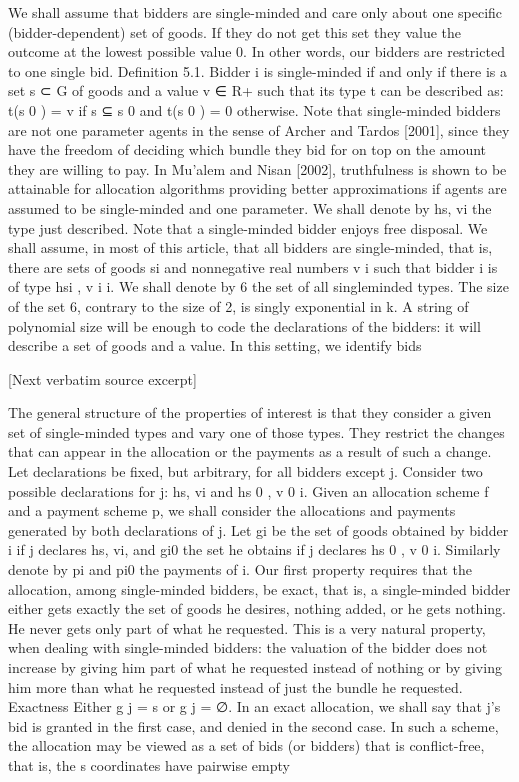 \documentclass[10pt]{article}
\begin{document}
\begin{ReviewVerbatim}

We shall assume that bidders are single-minded and care only about one specific
(bidder-dependent) set of goods. If they do not get this set they value the outcome
at the lowest possible value 0. In other words, our bidders are restricted to one
single bid.
Definition 5.1. Bidder i is single-minded if and only if there is a set s ⊂ G of
goods and a value v ∈ R+ such that its type t can be described as: t(s 0 ) = v if s ⊆ s 0
and t(s 0 ) = 0 otherwise.
Note that single-minded bidders are not one parameter agents in the sense
of Archer and Tardos [2001], since they have the freedom of deciding which bundle
they bid for on top on the amount they are willing to pay. In Mu’alem and Nisan
[2002], truthfulness is shown to be attainable for allocation algorithms providing
better approximations if agents are assumed to be single-minded and one parameter. We shall denote by hs, vi the type just described. Note that a single-minded
bidder enjoys free disposal. We shall assume, in most of this article, that all bidders
are single-minded, that is, there are sets of goods si and nonnegative real numbers
v i such that bidder i is of type hsi , v i i. We shall denote by 6 the set of all singleminded types. The size of the set 6, contrary to the size of 2, is singly exponential
in k. A string of polynomial size will be enough to code the declarations of the
bidders: it will describe a set of goods and a value. In this setting, we identify bids

[Next verbatim source excerpt]

The general structure of the properties of interest is that they consider a given
set of single-minded types and vary one of those types. They restrict the changes
that can appear in the allocation or the payments as a result of such a change.
Let declarations be fixed, but arbitrary, for all bidders except j. Consider two
possible declarations for j: hs, vi and hs 0 , v 0 i. Given an allocation scheme f and a
payment scheme p, we shall consider the allocations and payments generated by
both declarations of j. Let gi be the set of goods obtained by bidder i if j declares
hs, vi, and gi0 the set he obtains if j declares hs 0 , v 0 i. Similarly denote by pi and pi0
the payments of i.
Our first property requires that the allocation, among single-minded bidders, be
exact, that is, a single-minded bidder either gets exactly the set of goods he desires,
nothing added, or he gets nothing. He never gets only part of what he requested. This
is a very natural property, when dealing with single-minded bidders: the valuation
of the bidder does not increase by giving him part of what he requested instead of
nothing or by giving him more than what he requested instead of just the bundle
he requested.
Exactness Either g j = s or g j = ∅.
In an exact allocation, we shall say that j’s bid is granted in the first case, and denied
in the second case. In such a scheme, the allocation may be viewed as a set of bids
(or bidders) that is conflict-free, that is, the s coordinates have pairwise empty


\end{ReviewVerbatim}
\end{document}
